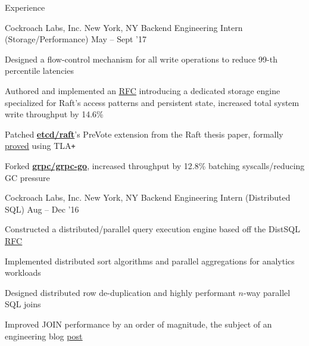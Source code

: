 \documentclass{resume} %
\begin{document}
\begin{rSection}{Experience}
  \begin{rSubsection}{Cockroach Labs, Inc.}
                     {New York, NY}
                     {Backend Engineering Intern (Storage/Performance)}
                     {May -- Sept '17}

    \item Designed a flow-control mechanism for all write operations to reduce
      99-th percentile latencies
    \item Authored and implemented an
      \href{https://github.com/cockroachdb/cockroach/pull/16361}{\underline {RFC}} introducing
      a dedicated storage
      engine specialized for Raft's access patterns and persistent state, increased
      total system write throughput by 14.6\%
    \item Patched
      \href{https://github.com/coreos/etcd/pull/8288}{\textbf{etcd/raft}}'s
      PreVote extension from the Raft thesis paper, formally
      \href{https://github.com/irfansharif/raft.tla/commit/22b05818b6bcfe6719a708f2270a1308fecbc0fa}{\underline {proved}}
      using TLA\texttt{+}
    \item Forked \href{https://github.com/irfansharif/grpc-go}{\textbf{grpc/grpc-go}},
      increased throughput by 12.8\% batching syscalls/reducing GC pressure
  \end{rSubsection}

  \begin{rSubsection}{Cockroach Labs, Inc.}
                     {New York, NY}
                     {Backend Engineering Intern (Distributed SQL)}
                     {Aug -- Dec '16}

    \item Constructed a distributed/parallel query execution engine based off
      the DistSQL
      \href{https://github.com/cockroachdb/cockroach/blob/master/docs/RFCS/20160421_distributed_sql.md}{\underline
      {RFC}}
    \item Implemented distributed sort algorithms and parallel aggregations for
      analytics workloads
    \item Designed distributed row de-duplication and highly performant $n$-way
      parallel SQL joins
    \item Improved JOIN performance by an order of magnitude, the
      subject of an engineering blog
      \href{https://www.cockroachlabs.com/blog/better-sql-joins-in-cockroachdb/}{\underline
      {post}}
  \end{rSubsection}


\end{rSection}
\end{document}
